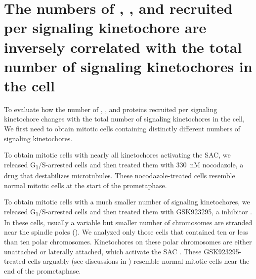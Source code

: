 \section{The numbers of , , and  recruited per signaling kinetochore are inversely correlated with the total number of signaling kinetochores in the cell}

To evaluate how the number of , , and  proteins recruited per signaling kinetochore changes with the total number of signaling kinetochores in the cell, We first need to obtain mitotic cells containing distinctly different numbers of signaling kinetochores.

To obtain mitotic cells with nearly all kinetochores activating the SAC, we released G\textsubscript{1}/S-arrested cells and then treated them with \SI{330}{nM} nocodazole, a drug that destabilizes microtubules. These nocodazole-treated cells resemble normal mitotic cells at the start of the prometaphase.

To obtain mitotic cells with a much smaller number of signaling kinetochores, we released G\textsubscript{1}/S-arrested cells and then treated them with GSK923295, a  inhibitor \cite{GSK923295}. In these cells, usually a variable but smaller number of chromosomes are stranded near the spindle poles (). We analyzed only those cells that contained ten or less than ten polar chromosomes. Kinetochores on these polar chromosomes are either unattached or laterally attached, which activate the SAC \cite{GSK923295LateralAttachmentEM, GSK923295MonastrolCotreatment}. These GSK923295-treated cells arguably (see discussions in ) resemble normal mitotic cells near the end of the prometaphase.

